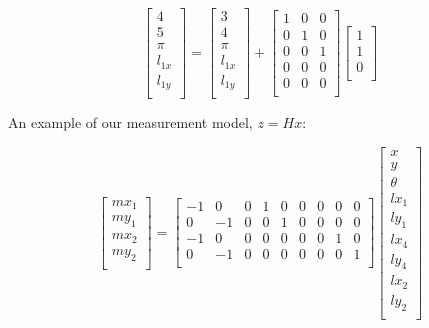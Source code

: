 \documentclass[prodmode,acmtecs]{acmsmall} %
\begin{document}
$$
\begin{bmatrix}
    4 \\
    5 \\
    \pi \\
    l_{1x} \\
    l_{1y} \\
\end{bmatrix}
=
\begin{bmatrix}
    3 \\
    4 \\
    \pi  \\
    l_{1x} \\
    l_{1y} \\
\end{bmatrix}
+
\begin{bmatrix}
    1 & 0 & 0  \\
    0 & 1 & 0  \\
    0 & 0 & 1  \\
    0 & 0 & 0  \\
    0 & 0 & 0  \\
\end{bmatrix}
\begin{bmatrix}
    1 \\
    1 \\
    0 \\
\end{bmatrix}
$$

An example of our measurement model, $z = Hx$:

$$
\begin{bmatrix}
    mx_1 \\
    my_1 \\
    mx_2 \\
    my_2 \\
\end{bmatrix}
=
\begin{bmatrix}
    -1 & 0 & 0 & 1 & 0 & 0 & 0 & 0 & 0 \\
    0 & -1 & 0 & 0 & 1 & 0 & 0 & 0 & 0 \\
    -1 & 0 & 0 & 0 & 0 & 0 & 0 & 1 & 0 \\
    0 & -1 & 0 & 0 & 0 & 0 & 0 & 0 & 1 \\
\end{bmatrix}
\begin{bmatrix}
    x \\
    y \\
    \theta \\
    lx_1 \\
    ly_1 \\
    lx_4 \\
    ly_4 \\
    lx_2 \\
    ly_2 \\
\end{bmatrix}
$$
\end{document}
